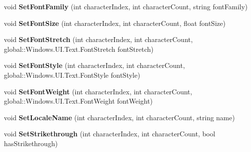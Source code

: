 \begin{DoxyCompactItemize}
void {\bfseries Set\+Font\+Family} (int character\+Index, int character\+Count, string font\+Family)
\item 
\mbox{\label{class_microsoft_1_1_graphics_1_1_canvas_1_1_text_1_1_canvas_text_layout_a2bd8d5f600cfc5fd4da25693e6735264}} 
void {\bfseries Set\+Font\+Size} (int character\+Index, int character\+Count, float font\+Size)
\item 
\mbox{\label{class_microsoft_1_1_graphics_1_1_canvas_1_1_text_1_1_canvas_text_layout_ad50a824a4bfd07dcc357647441ef7b28}} 
void {\bfseries Set\+Font\+Stretch} (int character\+Index, int character\+Count, global\+::\+Windows.\+U\+I.\+Text.\+Font\+Stretch font\+Stretch)
\item 
\mbox{\label{class_microsoft_1_1_graphics_1_1_canvas_1_1_text_1_1_canvas_text_layout_aa0cb0934c99cab9f6563ad3c1652fe2d}} 
void {\bfseries Set\+Font\+Style} (int character\+Index, int character\+Count, global\+::\+Windows.\+U\+I.\+Text.\+Font\+Style font\+Style)
\item 
\mbox{\label{class_microsoft_1_1_graphics_1_1_canvas_1_1_text_1_1_canvas_text_layout_a6afdb440ee71967887652cfeb495a190}} 
void {\bfseries Set\+Font\+Weight} (int character\+Index, int character\+Count, global\+::\+Windows.\+U\+I.\+Text.\+Font\+Weight font\+Weight)
\item 
\mbox{\label{class_microsoft_1_1_graphics_1_1_canvas_1_1_text_1_1_canvas_text_layout_afb6740be2f241b804cd331371d94e024}} 
void {\bfseries Set\+Locale\+Name} (int character\+Index, int character\+Count, string name)
\item 
\mbox{\label{class_microsoft_1_1_graphics_1_1_canvas_1_1_text_1_1_canvas_text_layout_adb3d9f62cfff14e9deb741c9b961e3a0}} 
void {\bfseries Set\+Strikethrough} (int character\+Index, int character\+Count, bool has\+Strikethrough)
\item 

\end{DoxyCompactItemize}
